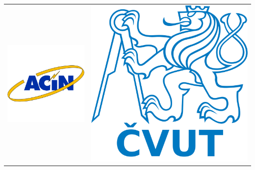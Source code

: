 \documentclass[mathserif,usenames,dvipsnames]{beamer}
\begin{document}
{\begin{center}
\begin{tabular}{c c}
    \includegraphics[scale=.25]{acin.png} & \includegraphics[scale=.25]{cvut.png} \\
    \end{tabular}
\end{center}
}
\end{document}
